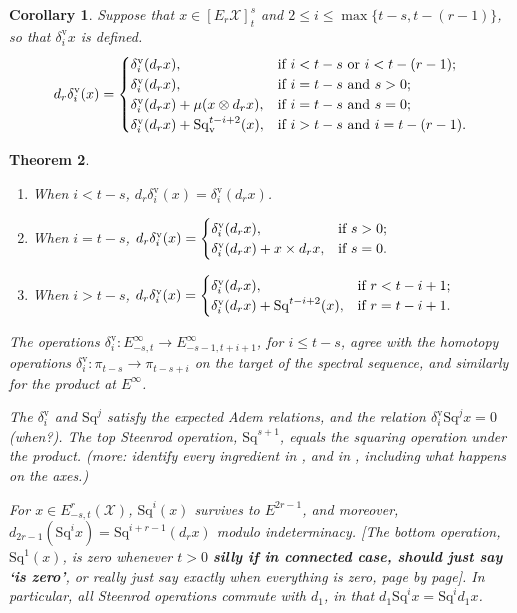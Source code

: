\documentclass[11pt]{amsart} \renewcommand{\baselinestretch}{1.4}
\theoremstyle{plain}
\newtheorem{thm}{Theorem}[section]
\newtheorem{cor}[thm]{Corollary}
\theoremstyle{definition}
\renewcommand{\to}{\longrightarrow}
\newcommand{\squishlist}{
  \setlength{\itemsep}{.5pt}
  \setlength{\parskip}{0pt}
  \setlength{\parsep}{0pt}}
\newcommand{\calx}{\mathcal{X}}
\newcommand{\citeBOX}[2][]{\cite[\mbox{#1}]{#2}}
\newcommand{\Sq}{\mathrm{Sq}}
\newcommand{\E}[5]{[E^{#1}_{#2}#3]^{#4}_{#5}}
\newcommand{\uver}{^\mathrm{v}}
\newcommand{\dver}{_\mathrm{v}}
\newcommand{\Sqv}{\mathrm{Sq}\dver}
\newcommand{\deltav}{\delta\uver}
\begin{document}
\begin{Operations on the Bousfield-Kan spectral sequence}
\begin{shaded}
\begin{cor}
\label{cor on meaning of equation for ddeltai vert}
Suppose that $x\in \E{}{r}{\calx}{s}{t}$ and $2\leq i\leq \max\{t-s,t-(r-1)\}$, so that $\deltav_ix $ is defined.
\[d_r\deltav_i(x)=\begin{cases}
\deltav_i(d_rx),&\textup{if $i< t-s$ or $i<t-(r-1)$};\\
\deltav_i(d_rx),&\textup{if $i=t-s$ and $s>0$};\\
\deltav_i(d_rx)+\mu(x\otimes d_rx),&\textup{if $i=t-s$ and  $s=0$};\\
\deltav_i(d_rx)+\Sqv^{t-i+2}(x),&\textup{if $i>t-s$ and $i=t-(r-1)$}.
\end{cases}\]
\end{cor}

\begin{thm}\hfil
\begin{enumerate}\squishlist
\setlength{\parindent}{.25in}
\item When $i<t-s$, $d_r\deltav_i(x)=\deltav_i(d_rx)$.
\item When $i=t-s$, $d_r\deltav_i(x)=\begin{cases}
\deltav_i(d_rx),&\textup{if }s>0;\\
\deltav_i(d_rx)+x\times d_rx,&\textup{if }s=0.
\end{cases}$
\item When $i>t-s$, $d_r\deltav_i(x)=\begin{cases}
\deltav_i(d_rx),&\textup{if }r<t-i+1;\\
\deltav_i(d_rx)+\Sq^{t-i+2}(x),&\textup{if }r=t-i+1.
\end{cases}$
\end{enumerate}
The operations $\deltav_i:E^\infty_{-s,t}\to E^\infty_{-s-1,t+i+1}$, for $i\leq t-s$, agree with the homotopy operations $\deltav_i:\pi_{t-s}\to \pi_{t-s+i}$ on the target of the spectral sequence, and similarly for the product at $E^\infty$.

The $\deltav_i$ and $\Sq^j$ satisfy the expected Adem relations, and the relation $\deltav_i\Sq^jx=0$ (when?). The top Steenrod operation, $\Sq^{s+1}$, equals the squaring operation under the product. (more: identify every ingredient in \citeBOX[{?2.1}]{DwyerHtpyOpsSimpComAlg.pdf}, and in \citeBOX[{?5.3}]{PriddySimplicialLie.pdf}, including what happens on the axes.)

For $x\in E^r_{-s,t}(\calx )$, $\Sq^i(x)$ survives to $E^{2r-1}$, and moreover, $d_{2r-1}(\Sq^ix)=\Sq^{i+r-1}(d_rx)$ modulo indeterminacy.  [The bottom operation, $\Sq^1(x)$, is zero whenever $t>0$\textbf{ silly if in connected case, should just say `is zero'}, or really just say exactly when everything is zero, page by page]. In particular, all Steenrod operations commute with $d_1$, in that $d_1\Sq^ix=\Sq^id_1x$.
\end{thm}
\end{shaded}











\end{Operations on the Bousfield-Kan spectral sequence}
\end{document}
